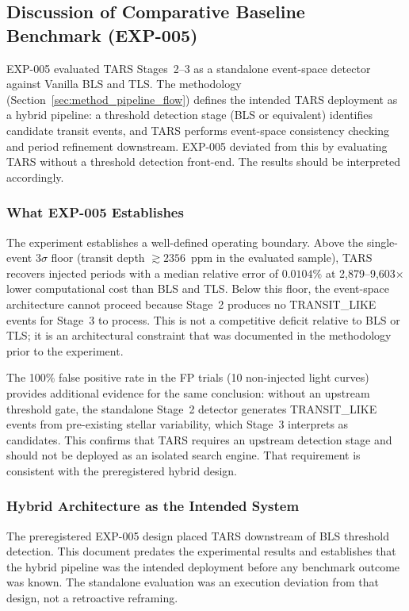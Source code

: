 \subsection{Discussion of Comparative Baseline Benchmark (EXP-005)} \label{sec:disc_exp5}

EXP-005 evaluated TARS Stages~2--3 as a standalone event-space detector against Vanilla BLS and TLS. The methodology (Section~\ref{sec:method_pipeline_flow}) defines the intended TARS deployment as a hybrid pipeline: a threshold detection stage (BLS or equivalent) identifies candidate transit events, and TARS performs event-space consistency checking and period refinement downstream. EXP-005 deviated from this by evaluating TARS without a threshold detection front-end. The results should be interpreted accordingly.

\subsubsection{What EXP-005 Establishes}

The experiment establishes a well-defined operating boundary. Above the single-event $3\sigma$ floor (transit depth $\gtrsim 2356$~ppm in the evaluated sample), TARS recovers injected periods with a median relative error of $0.0104\%$ at 2,879--9,603$\times$ lower computational cost than BLS and TLS. Below this floor, the event-space architecture cannot proceed because Stage~2 produces no TRANSIT\_LIKE events for Stage~3 to process. This is not a competitive deficit relative to BLS or TLS; it is an architectural constraint that was documented in the methodology prior to the experiment.

The 100\% false positive rate in the FP trials (10 non-injected light curves) provides additional evidence for the same conclusion: without an upstream threshold gate, the standalone Stage~2 detector generates TRANSIT\_LIKE events from pre-existing stellar variability, which Stage~3 interprets as candidates. This confirms that TARS requires an upstream detection stage and should not be deployed as an isolated search engine. That requirement is consistent with the preregistered hybrid design.

\subsubsection{Hybrid Architecture as the Intended System}

The preregistered EXP-005 design placed TARS downstream of BLS threshold detection. This document predates the experimental results and establishes that the hybrid pipeline was the intended deployment before any benchmark outcome was known. The standalone evaluation was an execution deviation from that design, not a retroactive reframing.


